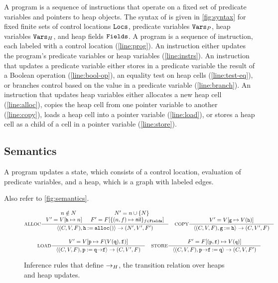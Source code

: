 A \lang program is a sequence of instructions that operate on a fixed
set of predicate variables and pointers to heap objects.
%
The syntax of \lang is given in \autoref{fig:syntax} for fixed finite
sets of control locations $\mathtt{Locs}$, predicate variables $\mathtt{Vars}_P$,
heap variables $\mathtt{Vars}_H$, and heap fields $\mathtt{Fields}$.
%
A program is a sequence of instruction, each labeled with a control
location (\autoref{line:prog}).
%
An instruction either updates the program's predicate variables or
heap variables (\autoref{line:instrs}).
%
An instruction that updates a predicate variable either stores in a
predicate variable the result of a Boolean operation
(\autoref{line:bool-op}),
%
an equality test on heap cells (\autoref{line:test-eq}),
%
or branches control based on the value in a predicate variable
(\autoref{line:branch}).
%
An instruction that updates heap variables either allocates a new heap
cell (\autoref{line:alloc}),
%
copies the heap cell from one pointer variable to another
(\autoref{line:copy}),
%
loads a heap cell into a pointer variable (\autoref{line:load}),
%
or stores a heap cell as a child of a cell in a pointer variable
(\autoref{line:store}).

\subsection{Semantics}
\label{sec:semantics}
%
A \lang program updates a state, which consists of a control location,
evaluation of predicate variables, and a heap, which is a graph with
labeled edges.
%

Also refer to \autoref{fig:semantics}.

\begin{figure*}
  \centering
  \begin{gather*}
    \inference[ALLOC]
    { n \notin N & N' = \add{n}{N} \\
      V' = \upd{V}{\cc{h}}{n}
      & F' = F[ \{ (n, f) \mapsto \nil \}_{f \in \fields} ]
    }
    { \langle (C, V, F), \code{h \assign \alloc()} \rangle \step
      (N', V', F')
    } \rulebuffer
    \inference[COPY]
    {  V' = \upd{V}{\cc{g}}{V(\cc{h})}
    }
    { \langle (C, V, F), \code{g \assign h} \rangle \step
      (C, V', F)
    } \\[\rowspace]
    \inference[LOAD]
    { V' = \upd{V}{\code{p}}{F(V(\code{q}), \code{f})}
    }
    { \langle (C, V, F), \code{p \assign q \select f} \rangle \step
      (C, V', F)
    } \rulebuffer
    \inference[STORE]
    { F' = \upd{F}{(\cc{p}, \cc{f})}{V(\cc{q})}
    }
    { \langle (C, V, F), \code{p \select f \assign q } \rangle
      \step
      (C, V, F')
    }
  \end{gather*}
  \caption{Inference rules that define $\rightarrow_H$, the transition
    relation over heaps and heap updates.}
  \label{fig:semantics}
\end{figure*}

